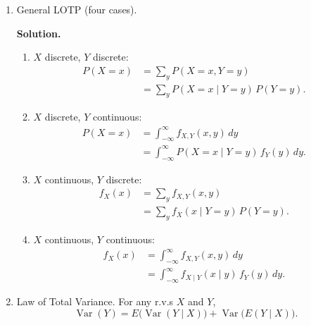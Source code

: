 \documentclass[11pt]{article}
\newcommand{\Var}{\operatorname{Var}}
\begin{document}
\begin{enumerate}[label=\arabic*., leftmargin=1.6em]
\begin{enumerate}
\newpage
\item General LOTP (four cases).
\begin{center}
\end{center}
\textbf{Solution.}
\begin{enumerate}[label=(\roman*)]
\item \(X\) discrete, \(Y\) discrete:
\begin{align*}
P(X=x)
&= \sum_{y} P(X=x,Y=y) \\
&= \sum_{y} P(X=x\mid Y=y)\,P(Y=y).
\end{align*}

\item \(X\) discrete, \(Y\) continuous:
\begin{align*}
P(X=x)
&= \int_{-\infty}^{\infty} f_{X,Y}(x,y)\,dy \\
&= \int_{-\infty}^{\infty} P(X=x\mid Y=y)\,f_{Y}(y)\,dy.
\end{align*}

\item \(X\) continuous, \(Y\) discrete:
\begin{align*}
f_{X}(x)
&= \sum_{y} f_{X,Y}(x,y) \\
&= \sum_{y} f_{X}(x\mid Y=y)\,P(Y=y).
\end{align*}

\item \(X\) continuous, \(Y\) continuous:
\begin{align*}
f_{X}(x)
&= \int_{-\infty}^{\infty} f_{X,Y}(x,y)\,dy \\
&= \int_{-\infty}^{\infty} f_{X\mid Y}(x\mid y)\,f_{Y}(y)\,dy.
\end{align*}
\end{enumerate}
\newpage
\item Law of Total Variance. For any r.v.s $X$ and $Y$,
\[
\Var(Y) = E\bigl(\Var(Y\mid X)\bigr) + \Var\bigl(E(Y\mid X)\bigr).
\]


\end{enumerate}
\end{enumerate}
\end{document}

